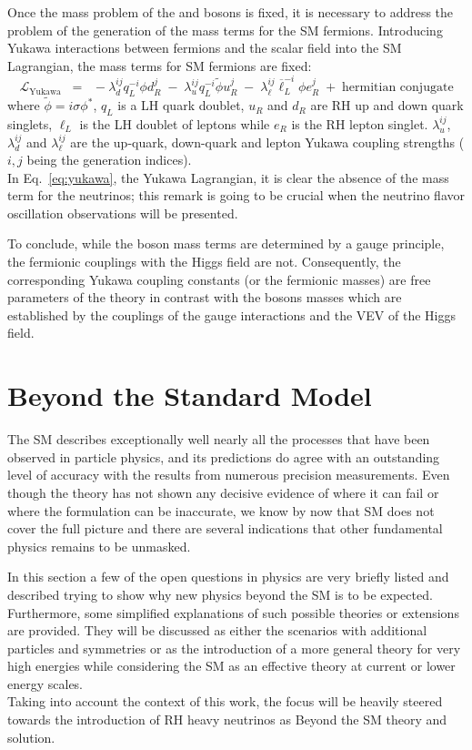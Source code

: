 Once the mass problem of the \PW and \PZ bosons is fixed, it is necessary to address the problem of the generation of the mass terms for the SM fermions. Introducing Yukawa interactions between fermions and the scalar field into the SM Lagrangian, the mass terms for SM fermions are fixed:
\begin{equation}
\label{eq:yukawa}
 \mathcal{L}_{\text{Yukawa}} \;\; = \;\; -\lambda^{ij}_dq^{-i}_L\phi d^j_R \;-\; \lambda^{ij}_uq^{-i}_L\tilde{\phi} u^j_R \;-\; \lambda^{ij}_{\ell}\overline{\ell}^{-i}_L\phi e^j_R \;+\; \text{hermitian conjugate}
\end{equation}
where $\tilde{\phi}= i\sigma\phi^*$, $q_L$ is a LH quark doublet, $u_R$ and $d_R$ are RH up and down quark singlets, $\ell_L$ is the LH doublet of leptons while $e_R$ is the RH lepton singlet. $\lambda^{ij}_u$, $\lambda^{ij}_d$ and $\lambda^{ij}_\ell$ are the up-quark, down-quark and lepton Yukawa coupling strengths ($i,j$ being the generation indices). \\
In Eq.~\ref{eq:yukawa}, the Yukawa Lagrangian, it is clear the absence of the mass term for the neutrinos; this remark is going to be crucial when the neutrino flavor oscillation observations will be presented.

To conclude, while the boson mass terms are determined by a gauge principle, the fermionic couplings with the Higgs field are not. Consequently, the corresponding Yukawa coupling constants (or the fermionic masses) are free parameters of the theory in contrast with the bosons masses which 
 are established by the couplings of the gauge interactions and the VEV of the Higgs field.


\clearpage
\section{Beyond the Standard Model}\label{sec:bsm}
The SM describes exceptionally well nearly all the processes that have been observed in particle physics, and its predictions do agree with an outstanding level of accuracy with the results from numerous precision measurements. Even though the theory has not shown any decisive evidence of where it can fail or where the formulation can be inaccurate, we know by now that SM does not cover the full picture and there are several indications that other fundamental physics remains to be unmasked.

In this section a few of the open questions in physics are very briefly listed and described trying to show why new physics beyond the SM is to be expected. Furthermore, some simplified explanations of such possible theories or extensions are provided. They will be discussed as either the scenarios with additional particles and symmetries or as the introduction of a more general theory for very high energies while considering the SM as an effective theory at current or lower energy scales.\\
Taking into account the context of this work, the focus will be heavily steered towards the introduction of RH heavy neutrinos as Beyond the SM theory and solution.



